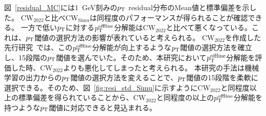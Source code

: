 図~\ref{residual_MC}には1~GeV刻みの$p_{\rm{T}}$ residual分布のMean値と標準偏差を示した。
$\mathrm{CW_{2022}}$と比べ$\mathrm{CW_{Simu}}$は同程度のパフォーマンスが得られることが確認できる。
一方で低い$p_{\rm{T}}$に対する$p_{\rm{T}}^{\rm{offline}}$分解能は$\mathrm{CW_{2022}}$と比べて悪くなっている。これは、$p_{\rm{T}}$閾値の選択方法の影響が表れていると考えられる。
$\mathrm{CW_{2022}}$を作成した先行研究~\cite{article:shiomi-mron}では、この$p_{\rm{T}}^{\rm{offline}}$分解能が向上するような$p_{\rm{T}}$閾値の選択方法を確立し、15段階の$p_{\rm{T}}$閾値を選んでいた。そのため、本研究において$p_{\rm{T}}^{\rm{offline}}$分解能を評価した時、$\mathrm{CW_{2022}}$よりも悪化してしまったと考えられる。
本研究の手法は機械学習の出力からの$p_{\rm{T}}$閾値の選択方法を変えることで、$p_{\rm{T}}$閾値の15段階を柔軟に選択できる。そのため、図~\ref{fig:resi_std_Simu}に示すように$\mathrm{CW_{2022}}$と同程度以上の標準偏差を得られていることから、$\mathrm{CW_{2022}}$と同程度の以上の$p_{\rm{T}}^{\rm{offline}}$分解能を持つような$p_{\rm{T}}$閾値に対応できると見込まれる。

